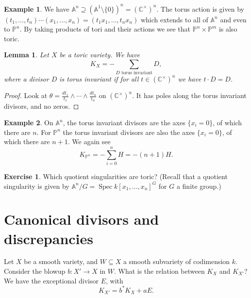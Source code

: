 \documentclass{article}
\newtheorem*{lemma}{Lemma}
\theoremstyle{definition}
\newtheorem*{example}{Example}
\newtheorem*{exercise}{Exercise}
\DeclareMathOperator{\Spec}{Spec}
\newcommand{\A}{\mathbb{A}}
\renewcommand{\P}{\mathbb{P}}
\newcommand{\C}{\mathbb{C}}
\begin{document}
\begin{example}
    We have $\A^n\supseteq(\A^1\setminus\{0\})^n=(\C^\times)^n$. The torus
    action is given by
    $(t_1,\ldots,t_n)\cdots(x_1,\ldots,x_n)=(t_1x_1,\ldots,t_nx_n)$ which
    extends to all of $\A^n$ and even to $\P^n$. By taking products of tori and
    their actions we see that $\P^n\times\P^m$ is also toric.
\end{example}

\begin{lemma}
    Let $X$ be a toric variety. We have
    \begin{equation*}
        K_X = -\sum_{\text{$D$ torus invariant}}D,
    \end{equation*}
    where a divisor $D$ is torus invariant if for all $t\in(\C^\times)^n$ we
    have $t\cdot D=D$.
\end{lemma}

\begin{proof}
    Look at $\theta=\frac{dt_1}{t_1}\wedge\cdots\wedge\frac{dt_n}{t_n}$ on
    $(\C^\times)^n$. It has poles along the torus invariant divisors, and no
    zeros.
\end{proof}

\begin{example}
    On $\A^n$, the torus invariant divisors are the axes $\{x_i=0\}$, of which
    there are $n$. For $\P^n$ the torus invariant divisors are also the axes
    $\{x_i=0\}$, of which there are $n+1$. We again see
    \begin{equation*}
        K_{\P^n}=-\sum_{i=0}^nH=-(n+1)H.
    \end{equation*}
\end{example}

\begin{exercise}
    Which quotient singularities are toric? (Recall that a quotient singularity
    is given by $\A^n/G=\Spec k[x_1,\ldots,x_n]^G$ for $G$ a finite group.)
\end{exercise}

\section*{Canonical divisors and discrepancies}

Let $X$ be a smooth variety, and $W\subseteq X$ a smooth subvariety of
codimension $k$. Consider the blowup $b:X'\to X$ in $W$. What is the relation
between $K_X$ and $K_{X'}$? We have the exceptional divisor $E$, with
\begin{equation*}
    K_{X'} = b^*K_X + aE.
\end{equation*}
\end{document}
